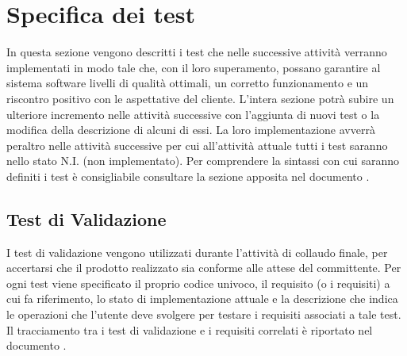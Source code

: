 \documentclass[a4paper, titlepage]{article}
\begin{document}
\newpage
\section{Specifica dei test}
In questa sezione vengono descritti i test che nelle successive attività verranno implementati in modo tale che, con il loro superamento, possano garantire al sistema software livelli di qualità ottimali, un corretto funzionamento e un riscontro positivo con le aspettative del cliente.
\newline L'intera sezione potrà subire un ulteriore incremento nelle attività successive con l'aggiunta di nuovi test o la modifica della descrizione di alcuni di essi. La loro implementazione avverrà peraltro nelle attività successive per cui all'attività attuale tutti i test saranno nello stato N.I. (non implementato).
\newline Per comprendere la sintassi con cui saranno definiti i test è consigliabile consultare la sezione apposita nel documento .

\subsection{Test di Validazione}
I test di validazione vengono utilizzati durante l'attività di collaudo finale, per accertarsi che il prodotto realizzato sia conforme alle attese del committente.
\newline Per ogni test viene specificato il proprio codice univoco, il requisito (o i requisiti) a cui fa riferimento, lo stato di implementazione attuale e la descrizione che indica le operazioni che l'utente deve svolgere per testare i requisiti associati a tale test. 
\newline Il tracciamento tra i test di validazione e i requisiti correlati è riportato nel documento .
\end{document}
